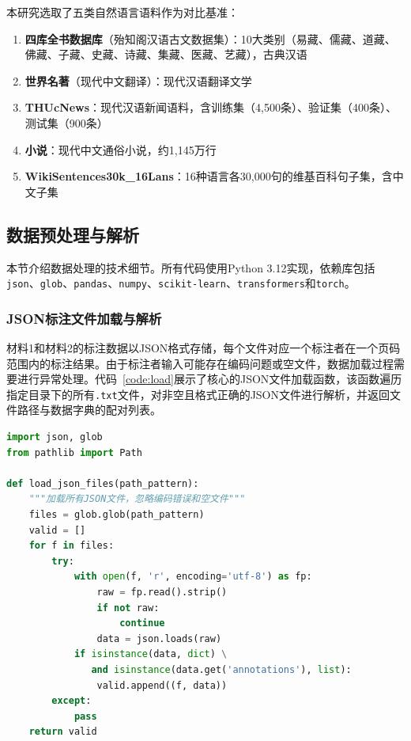 \documentclass[a4paper,12pt]{article}
\begin{document}
本研究选取了五类自然语言语料作为对比基准：
\begin{enumerate}
    \item \textbf{四库全书数据库}（殆知阁汉语古文数据集）：10大类别（易藏、儒藏、道藏、佛藏、子藏、史藏、诗藏、集藏、医藏、艺藏），古典汉语
    \item \textbf{世界名著}（现代中文翻译）：现代汉语翻译文学
    \item \textbf{THUcNews}：现代汉语新闻语料，含训练集（4,500条）、验证集（400条）、测试集（900条）
    \item \textbf{小说}：现代中文通俗小说，约1,145万行
    \item \textbf{WikiSentences30k\_16Lans}：16种语言各30,000句的维基百科句子集，含中文子集
\end{enumerate}

\subsection{数据预处理与解析}

本节介绍数据处理的技术细节。所有代码使用Python 3.12实现，依赖库包括\texttt{json}、\texttt{glob}、\texttt{pandas}、\texttt{numpy}、\texttt{scikit-learn}、\texttt{transformers}和\texttt{torch}。

\subsubsection{JSON标注文件加载与解析}

材料1和材料2的标注数据以JSON格式存储，每个文件对应一个标注者在一个页码范围内的标注结果。由于标注者输入可能存在编码问题或空文件，数据加载过程需要进行异常处理。代码~\ref{code:load}展示了核心的JSON文件加载函数，该函数遍历指定目录下的所有\texttt{.txt}文件，对非空且格式正确的JSON文件进行解析，并返回文件路径与数据字典的配对列表。

\begin{lstlisting}[language=Python, caption=JSON标注文件加载函数, label=code:load]
import json, glob
from pathlib import Path

def load_json_files(path_pattern):
    """加载所有JSON文件，忽略编码错误和空文件"""
    files = glob.glob(path_pattern)
    valid = []
    for f in files:
        try:
            with open(f, 'r', encoding='utf-8') as fp:
                raw = fp.read().strip()
                if not raw: 
                    continue
                data = json.loads(raw)
            if isinstance(data, dict) \
               and isinstance(data.get('annotations'), list):
                valid.append((f, data))
        except:
            pass
    return valid
\end{lstlisting}
\end{document}
